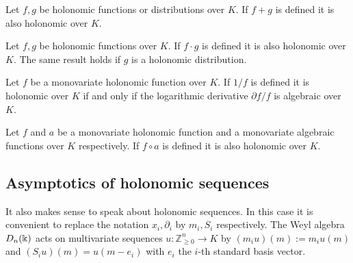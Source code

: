     \begin{theorem}{\cite[Proposition 3.1]{zeilberger1990holonomic}}
      Let $f,g$ be holonomic functions or distributions over $K$.
      If $f+g$ is defined it is also holonomic over $K$.
    \end{theorem}
    \begin{theorem}{\cite[Proposition 3.2]{zeilberger1990holonomic}}
      Let $f,g$ be holonomic functions over $K$.
      If $f\cdot g$ is defined it is also holonomic over $K$.
      The same result holds if $g$ is a holonomic distribution.
    \end{theorem}
    \begin{theorem}{\cite[Corollary 1]{harris1985reciprocals}}
      Let $f$ be a monovariate holonomic function over $K$.
      If $1/f$ is defined it is holonomic over $K$ if and only if the logarithmic derivative $\partial f/f$ is algebraic over $K$.
    \end{theorem}
    \begin{theorem}{\cite[Theorem 2.7]{stanley1980differentiably}}\label{thm: AlgebraicPrecomp}
      Let $f$ and $a$ be a monovariate holonomic function and a monovariate algebraic functions over $K$ respectively.
      If $f\circ a$ is defined it is also holonomic over $K$.
    \end{theorem}
    \subsection{Asymptotics of holonomic sequences}
    It also makes sense to speak about holonomic sequences.
    In this case it is convenient to replace the notation $x_i,\partial_i$ by $m_i,S_i$ respectively.
    The Weyl algebra $D_n(\Bbbk)$ acts on multivariate sequences $u:\mathbb{Z}_{\geq 0}^n \to K$ by $(m_iu)(m):= m_i u(m)$ and $(S_iu)(m) = u(m-e_i)$ with $e_i$ the $i$-th standard basis vector.

